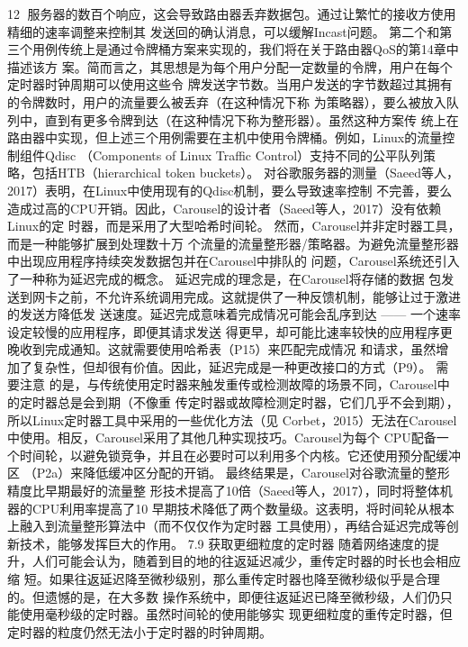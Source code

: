                                                                 12
服务器的数百个响应，这会导致路由器丢弃数据包。通过让繁忙的接收方使用精细的速率调整来控制其
发送回的确认消息，可以缓解Incast问题。
第二个和第三个用例传统上是通过令牌桶方案来实现的，我们将在关于路由器QoS的第14章中描述该方
案。简而言之，其思想是为每个用户分配一定数量的令牌，用户在每个定时器时钟周期可以使用这些令
牌发送字节数。当用户发送的字节数超过其拥有的令牌数时，用户的流量要么被丢弃（在这种情况下称
为策略器），要么被放入队列中，直到有更多令牌到达（在这种情况下称为整形器）。虽然这种方案传
统上在路由器中实现，但上述三个用例需要在主机中使用令牌桶。例如，Linux的流量控制组件Qdisc
（Components of Linux Traffic Control）支持不同的公平队列策略，包括HTB（hierarchical token
buckets）。
对谷歌服务器的测量（Saeed等人，2017）表明，在Linux中使用现有的Qdisc机制，要么导致速率控制
不完善，要么造成过高的CPU开销。因此，Carousel的设计者（Saeed等人，2017）没有依赖Linux的定
时器，而是采用了大型哈希时间轮。 然而，Carousel并非定时器工具，而是一种能够扩展到处理数十万
个流量的流量整形器/策略器。为避免流量整形器中出现应用程序持续突发数据包并在Carousel中排队的
问题，Carousel系统还引入了一种称为延迟完成的概念。 延迟完成的理念是，在Carousel将存储的数据
包发送到网卡之前，不允许系统调用完成。这就提供了一种反馈机制，能够让过于激进的发送方降低发
送速度。延迟完成意味着完成情况可能会乱序到达 —— 一个速率设定较慢的应用程序，即便其请求发送
得更早，却可能比速率较快的应用程序更晚收到完成通知。这就需要使用哈希表（P15）来匹配完成情况
和请求，虽然增加了复杂性，但却很有价值。因此，延迟完成是一种更改接口的方式（P9）。 需要注意
的是，与传统使用定时器来触发重传或检测故障的场景不同，Carousel中的定时器总是会到期（不像重
传定时器或故障检测定时器，它们几乎不会到期），所以Linux定时器工具中采用的一些优化方法（见
Corbet，2015）无法在Carousel中使用。相反，Carousel采用了其他几种实现技巧。Carousel为每个
CPU配备一个时间轮，以避免锁竞争，并且在必要时可以利用多个内核。它还使用预分配缓冲区
（P2a）来降低缓冲区分配的开销。 最终结果是，Carousel对谷歌流量的整形精度比早期最好的流量整
形技术提高了10倍（Saeed等人，2017），同时将整体机器的CPU利用率提高了10%
早期技术降低了两个数量级。这表明，将时间轮从根本上融入到流量整形算法中（而不仅仅作为定时器
工具使用），再结合延迟完成等创新技术，能够发挥巨大的作用。
7.9 获取更细粒度的定时器
随着网络速度的提升，人们可能会认为，随着到目的地的往返延迟减少，重传定时器的时长也会相应缩
短。如果往返延迟降至微秒级别，那么重传定时器也降至微秒级似乎是合理的。但遗憾的是，在大多数
操作系统中，即便往返延迟已降至微秒级，人们仍只能使用毫秒级的定时器。虽然时间轮的使用能够实
现更细粒度的重传定时器，但定时器的粒度仍然无法小于定时器的时钟周期。
